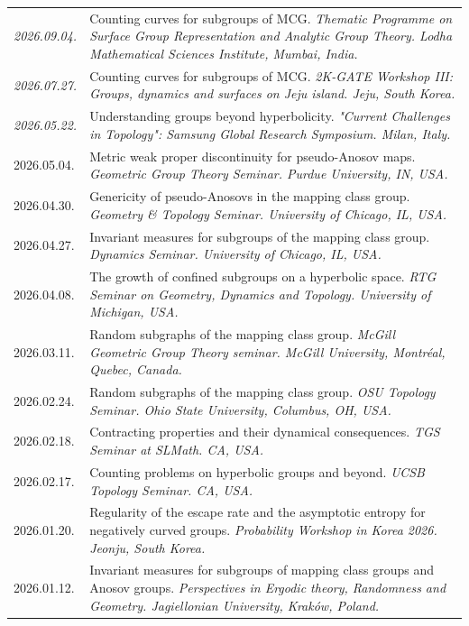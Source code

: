 \documentclass[a4paper, 10pt]{article}
\begin{document}
\begin{tabular}{Q{2.45cm}P{13cm}}
\textit{2026.09.04.} &  Counting curves for subgroups of MCG. \textit{Thematic Programme on Surface Group Representation and Analytic Group Theory. Lodha Mathematical Sciences Institute, Mumbai, India.}\\
\textit{2026.07.27.} & Counting curves for subgroups of MCG. \textit{2K-GATE Workshop III: Groups, dynamics and surfaces on Jeju island. Jeju, South Korea.}\\
\textit{2026.05.22.} & Understanding groups beyond hyperbolicity. \textit{"Current Challenges in Topology": Samsung Global Research Symposium. Milan, Italy.}\\
\small{2026.05.04.} & Metric weak proper discontinuity for pseudo-Anosov maps. \textit{Geometric Group Theory Seminar. Purdue University, IN, USA.}\\
\small{2026.04.30.} & Genericity of pseudo-Anosovs in the mapping class group. \textit{Geometry \& Topology Seminar. University of Chicago, IL, USA.}\\
\small{2026.04.27.} & Invariant measures for subgroups of the mapping class group. \textit{Dynamics Seminar. University of Chicago, IL, USA.}\\
\small{2026.04.08.} & The growth of confined subgroups on a hyperbolic space. \textit{RTG Seminar on Geometry, Dynamics and Topology. University of Michigan, USA.}\\
\small{2026.03.11.} & Random subgraphs of the mapping class group. \textit{McGill Geometric Group Theory seminar. McGill University, Montréal, Quebec, Canada.}\\
\small{2026.02.24.} & Random subgraphs of the mapping class group. \textit{OSU Topology Seminar. Ohio State University, Columbus, OH, USA.}\\
\small{2026.02.18.} & Contracting properties and their dynamical consequences. \textit{TGS Seminar at SLMath. CA, USA.}\\
\small{2026.02.17.} & Counting problems on hyperbolic groups and beyond. \textit{UCSB Topology Seminar. CA, USA.}\\
\small{2026.01.20.}& Regularity of the escape rate and the asymptotic entropy for negatively curved groups.  \textit{Probability Workshop in Korea 2026. Jeonju, South Korea.}\\
\small{2026.01.12.} & Invariant measures for subgroups of mapping class groups and Anosov groups. \textit{Perspectives in Ergodic theory, Randomness and Geometry. Jagiellonian University, Kraków, Poland.} \\

\end{tabular}
\end{document}
